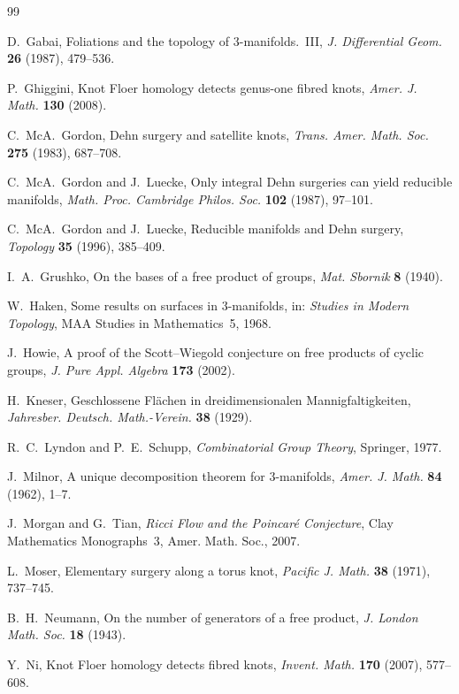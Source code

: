\documentclass[11pt]{article}
\theoremstyle{definition}
\begin{document}
\begin{thebibliography}{99}

D.~Gabai, Foliations and the topology of $3$-manifolds.~III, \emph{J. Differential Geom.} \textbf{26} (1987), 479--536.

P.~Ghiggini, Knot Floer homology detects genus-one fibred knots, \emph{Amer. J. Math.} \textbf{130} (2008).

C.~McA.~Gordon, Dehn surgery and satellite knots, \emph{Trans. Amer. Math. Soc.} \textbf{275} (1983), 687--708.

C.~McA.~Gordon and J.~Luecke, Only integral Dehn surgeries can yield reducible manifolds, \emph{Math. Proc. Cambridge Philos. Soc.} \textbf{102} (1987), 97--101.

C.~McA.~Gordon and J.~Luecke, Reducible manifolds and Dehn surgery, \emph{Topology} \textbf{35} (1996), 385--409.

I.~A.~Grushko, On the bases of a free product of groups, \emph{Mat. Sbornik} \textbf{8} (1940).

W.~Haken, Some results on surfaces in $3$-manifolds, in: \emph{Studies in Modern Topology}, MAA Studies in Mathematics~5, 1968.

J.~Howie, A proof of the Scott--Wiegold conjecture on free products of cyclic groups, \emph{J. Pure Appl. Algebra} \textbf{173} (2002).

H.~Kneser, Geschlossene Fl\"achen in dreidimensionalen Mannigfaltigkeiten, \emph{Jahresber. Deutsch. Math.-Verein.} \textbf{38} (1929).

R.~C.~Lyndon and P.~E.~Schupp, \emph{Combinatorial Group Theory}, Springer, 1977.

J.~Milnor, A unique decomposition theorem for $3$-manifolds, \emph{Amer. J. Math.} \textbf{84} (1962), 1--7.

J.~Morgan and G.~Tian, \emph{Ricci Flow and the Poincar\'e Conjecture}, Clay Mathematics Monographs~3, Amer. Math. Soc., 2007.

L.~Moser, Elementary surgery along a torus knot, \emph{Pacific J. Math.} \textbf{38} (1971), 737--745.

B.~H.~Neumann, On the number of generators of a free product, \emph{J. London Math. Soc.} \textbf{18} (1943).

Y.~Ni, Knot Floer homology detects fibred knots, \emph{Invent. Math.} \textbf{170} (2007), 577--608.


\end{thebibliography}
\end{document}
